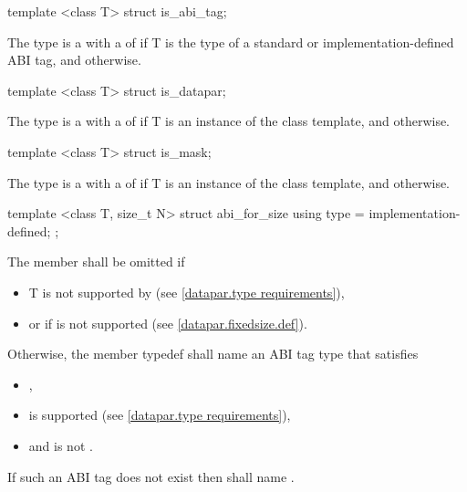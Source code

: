 \begin{itemdecl}
template <class T> struct is_abi_tag;
\end{itemdecl}
\begin{itemdescr}
  \pnum The type  is a \UnaryTypeTrait with a \BaseCharacteristic of  if \type T is the type of a standard or implementation-defined ABI tag, and  otherwise.
\end{itemdescr}

\begin{itemdecl}
template <class T> struct is_datapar;
\end{itemdecl}
\begin{itemdescr}
  \pnum The type  is a \UnaryTypeTrait with a \BaseCharacteristic of  if \type T is an instance of the \datapar class template, and  otherwise.
\end{itemdescr}

\begin{itemdecl}
template <class T> struct is_mask;
\end{itemdecl}
\begin{itemdescr}
  \pnum The type  is a \UnaryTypeTrait with a \BaseCharacteristic of  if \type T is an instance of the \mask class template, and  otherwise.
\end{itemdescr}

\begin{itemdecl}
template <class T, size_t N> struct abi_for_size { using type = implementation-defined; };
\end{itemdecl}
\begin{itemdescr}
  \pnum The member  shall be omitted if
  \begin{itemize}
    \item \type T is not supported by \datapar (see \ref{datapar.type requirements}),
    \item or if \fixedsizeN is not supported (see \ref{datapar.fixedsize.def}).
  \end{itemize}

  \pnum Otherwise, the member typedef  shall name an ABI tag type that satisfies
  \begin{itemize}
    \item {},
    \item \datapar[<T, type>] is supported (see \ref{datapar.type requirements}),
    \item and  is not \fixedsizeN.
  \end{itemize}
  If such an ABI tag does not exist then  shall name \fixedsizeN.
\end{itemdescr}

